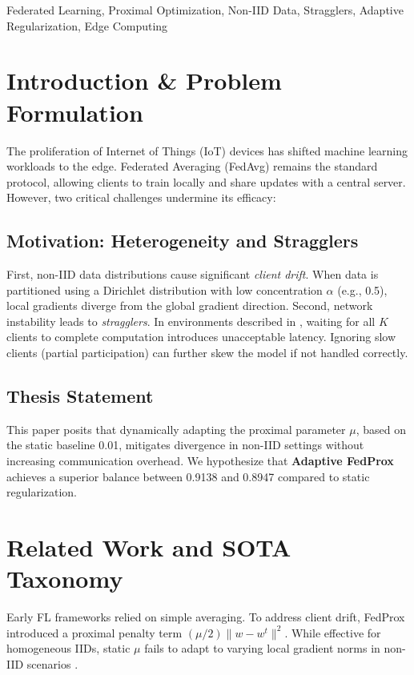 \documentclass[conference]{IEEEtran}
\begin{document}
\begin{IEEEkeywords}
Federated Learning, Proximal Optimization, Non-IID Data, Stragglers, Adaptive Regularization, Edge Computing
\end{IEEEkeywords}

\section{Introduction \& Problem Formulation}\label{sec:intro}
The proliferation of Internet of Things (IoT) devices has shifted machine learning workloads to the edge. Federated Averaging (FedAvg) \cite{mcmahan2017communication} remains the standard protocol, allowing clients to train locally and share updates with a central server. However, two critical challenges undermine its efficacy:

\subsection{Motivation: Heterogeneity and Stragglers}
First, non-IID data distributions cause significant \textit{client drift}. When data is partitioned using a Dirichlet distribution with low concentration $\alpha$ (e.g., 0.5), local gradients diverge from the global gradient direction. Second, network instability leads to \textit{stragglers}. In environments described in \cite{kairouz2024advances}, waiting for all $K$ clients to complete computation introduces unacceptable latency. Ignoring slow clients (partial participation) can further skew the model if not handled correctly.

\subsection{Thesis Statement}
This paper posits that dynamically adapting the proximal parameter $\mu$, based on the static baseline 0.01, mitigates divergence in non-IID settings without increasing communication overhead. We hypothesize that \textbf{Adaptive FedProx} achieves a superior balance between 0.9138 and 0.8947 compared to static regularization.

\section{Related Work and SOTA Taxonomy}\label{sec:sota}
Early FL frameworks relied on simple averaging. To address client drift, FedProx \cite{li2020federated} introduced a proximal penalty term $(\mu/2)\|w - w^t\|^2$. While effective for homogeneous IIDs, static $\mu$ fails to adapt to varying local gradient norms in non-IID scenarios \cite{wang2023tackling}. 
\end{document}

